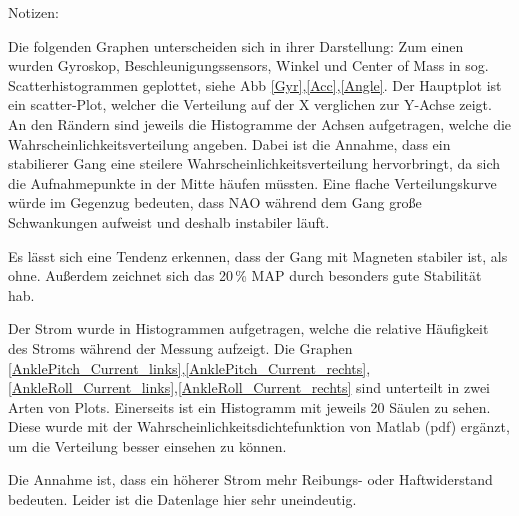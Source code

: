 Notizen:

Die folgenden Graphen unterscheiden sich in ihrer Darstellung: Zum einen wurden Gyroskop, Beschleunigungssensors, Winkel und Center of Mass in sog. Scatterhistogrammen geplottet, siehe Abb \ref{Gyr},\ref{Acc},\ref{Angle}. Der Hauptplot ist ein scatter-Plot, welcher die Verteilung auf der X verglichen zur Y-Achse zeigt. An den Rändern sind jeweils die Histogramme der Achsen aufgetragen, welche die Wahrscheinlichkeitsverteilung angeben. Dabei ist die Annahme, dass ein stabilierer Gang eine steilere Wahrscheinlichkeitsverteilung hervorbringt, da sich die Aufnahmepunkte in der Mitte häufen müssten. Eine flache Verteilungskurve würde im Gegenzug bedeuten, dass NAO während dem Gang große Schwankungen aufweist und deshalb instabiler läuft.

Es lässt sich eine Tendenz erkennen, dass der Gang mit Magneten stabiler ist, als ohne. Außerdem zeichnet sich das 20\,\% MAP durch besonders gute Stabilität hab. 

Der Strom wurde in Histogrammen aufgetragen, welche die relative Häufigkeit des Stroms während der Messung aufzeigt. Die Graphen \ref{AnklePitch_Current_links},\ref{AnklePitch_Current_rechts},\ref{AnkleRoll_Current_links},\ref{AnkleRoll_Current_rechts} sind unterteilt in zwei Arten von Plots. Einerseits ist ein Histogramm mit jeweils 20 Säulen zu sehen. Diese wurde mit der Wahrscheinlichkeitsdichtefunktion von Matlab (pdf) ergänzt, um die Verteilung besser einsehen zu können.

Die Annahme ist, dass ein höherer Strom mehr Reibungs- oder Haftwiderstand bedeuten. Leider ist die Datenlage hier sehr uneindeutig. 

